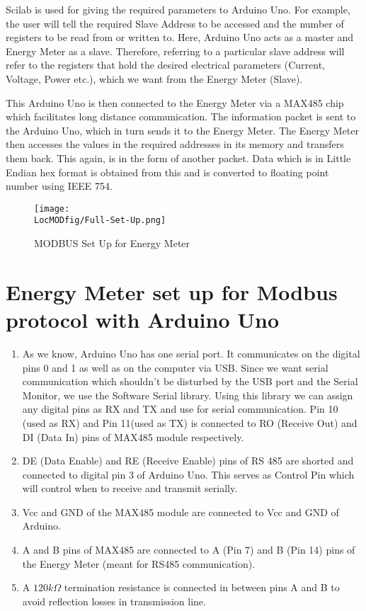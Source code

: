 Scilab is used for giving the required parameters to Arduino Uno. For
example, the user will tell the required Slave Address to be accessed
and the number of registers to be read from or written to. Here,
Arduino Uno acts as a master and Energy Meter as a slave. Therefore,
referring to a particular slave address will refer to the registers
that hold the desired electrical parameters (Current, Voltage, Power
etc.), which we want from the Energy Meter (Slave).

This Arduino Uno is then connected to the Energy Meter via a MAX485
chip which facilitates long distance communication. The information
packet is sent to the Arduino Uno, which in turn sends it to the
Energy Meter. The Energy Meter then accesses the values in the
required addresses in its memory and transfers them back. This again,
is in the form of another packet. Data which is in Little Endian hex
format is obtained from this and is converted to floating point number
using IEEE 754.

\begin{figure}
\centering
\texttt{[image: \\LocMODfig/Full-Set-Up.png]}
\caption{MODBUS Set Up for Energy Meter}
\label{fig:full-set-up}
\end{figure}

\section{Energy Meter set up for Modbus protocol with Arduino Uno}
\begin{enumerate}
\item As we know, Arduino Uno has one serial port. It communicates on
  the digital pins 0 and 1 as well as on the computer via USB. Since
  we want serial communication which shouldn't be disturbed by the USB
  port and the Serial Monitor, we use the Software Serial
  library. Using this library we can assign any digital pins as RX and
  TX and use for serial communication. Pin 10 (used as RX) and Pin
  11(used as TX) is connected to RO (Receive Out) and DI (Data In)
  pins of MAX485 module respectively.
\item DE (Data Enable) and RE (Receive Enable) pins of RS 485 are
  shorted and connected to digital pin 3 of Arduino Uno. This serves
  as Control Pin which will control when to receive and transmit
  serially.
\item Vcc and GND of the MAX485 module are connected to Vcc and GND of
  Arduino.
\item A and B pins of MAX485 are connected to A (Pin 7) and B (Pin 14)
  pins of the Energy Meter (meant for RS485 communication).
\item A $120k\Omega$ termination resistance is connected in between
  pins A and B to avoid reflection losses in transmission line.
\end{enumerate}

